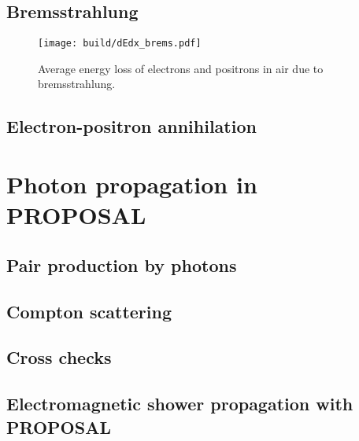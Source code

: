 \subsection{Bremsstrahlung}

%
\begin{figure}
    \centering
    \texttt{[image: build/dEdx\_brems.pdf]}
    \caption{Average energy loss of electrons and positrons in air due to bremsstrahlung.}
    \label{fig:dEdx_brems}
\end{figure}
%

\subsection{Electron-positron annihilation}

\section{Photon propagation in PROPOSAL}

\subsection{Pair production by photons}

\subsection{Compton scattering}

\subsection{Cross checks}

\subsection{Electromagnetic shower propagation with PROPOSAL}
